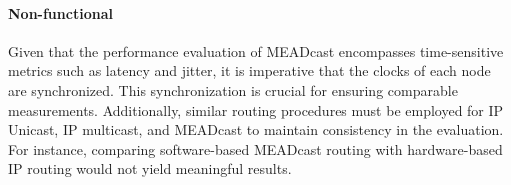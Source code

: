 \paragraph{Non-functional} %
\label{par:Non-functional}
Given that the performance evaluation of MEADcast encompasses time-sensitive
    metrics such as latency and jitter, it is imperative that the clocks of
    each node are synchronized.
This synchronization is crucial for ensuring comparable measurements.
Additionally, similar routing procedures must be employed for IP Unicast, IP
    multicast, and MEADcast to maintain consistency in the evaluation.
For instance, comparing software-based MEADcast routing with hardware-based IP
    routing would not yield meaningful results.



